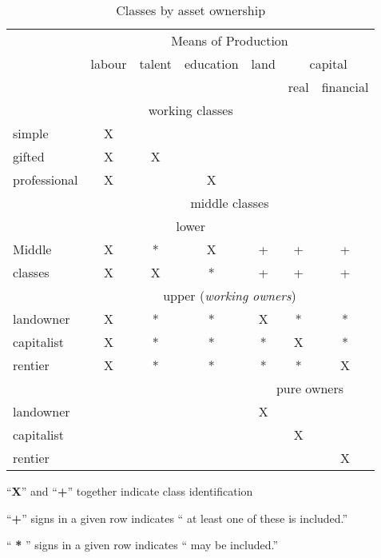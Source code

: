 \begin{table}[!ht]
    \begin{centering}
\begin{tabular}{lcccccc}\small
  
    & \multicolumn{6}{c}{Means of Production}\\   \cline{2-7}
     &labour &talent & education& land & \multicolumn{2}{c}{capital} \\ \cline{6-7}
     &       &       &          &       &real   &financial  \\ 
     \hline
      \multicolumn{7}{c}{working classes}\\
simple& X   &       &         &         &       &\\
gifted& X   &    X  &         &         &       &\\
professional& X   &       &    X   &         &       &\\\hline
& \multicolumn{6}{c}{middle classes}\\  
   \multicolumn{7}{c}{lower}\\
Middle  & X   & * & X  & +&  + & +\\
classes & X   & X & *  & + & + & +\\\hline

 & \multicolumn{6}{c}{upper (\textit{working owners})}\\
landowner & X  &   *   & * &   X   &   *  & * \\
capitalist& X  &   *   & * &   *   &   X &  *\\
rentier   & X  &   *   & * &   *   &   * & X\\\hline

&&&& \multicolumn{3}{c}{pure owners}\\
landowner  &   &  & &   X  &       &\\
capitalist &   &  &  &     & X  &\\
rentier    &   &  &  &     &   & X\\ \hline
\end{tabular}
\end{centering}
\vspace{.25cm}

``\textbf{X}'' and “\textbf{+}” together indicate class identification

``\textbf{+}'' signs in a given row indicates `` at least one of these is included.''

\noindent``\textbf{ * }'' signs in a given row indicates `` may be included.''
\caption{Classes by asset ownership}
    \label{tab:classes}
\end{table}
% 
% 
% 


